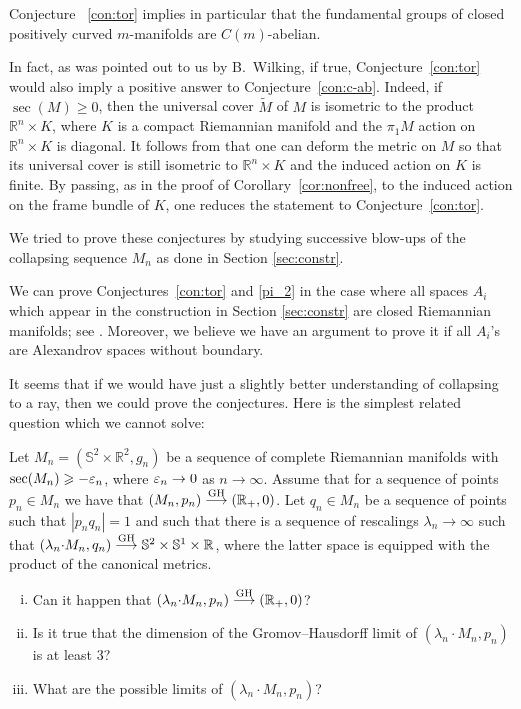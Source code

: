 \documentclass{amsart}
\begin{document}
Conjecture ~\ref{con:tor} implies in particular that the fundamental
groups of closed positively curved $m$-manifolds are $C(m)$-abelian.

In fact, as was pointed out to us by B.~Wilking, if true,
Conjecture~\ref{con:tor} would also imply a positive answer to Conjecture~\ref{con:c-ab}.
Indeed, if $\sec(M)\ge0$, then the universal cover $\tilde M$ of $M$ is isometric to the product $\mathbb{R}^n\times K$, where $K$ is a compact Riemannian manifold and the $\pi_1M$ action  on $\mathbb{R}^n\times K$ is diagonal.
It follows from \cite[Cor. 6.3]{wilking} that one can deform the metric on $M$ so that its universal cover is still isometric to $\mathbb{R}^n\times K$ and the induced action on $K$ is finite.
By passing, as in the proof of Corollary~\ref{cor:nonfree}, to the induced action on the frame bundle of $K$, one reduces the statement to Conjecture~\ref{con:tor}.

We tried to prove these conjectures by studying successive blow-ups of the
collapsing sequence $M_n$ as done in Section \ref{sec:constr}.

We can prove  Conjectures~\ref{con:tor} and \ref{pi_2} in the case where  all spaces $A_i$ which appear in the construction in  Section \ref{sec:constr} are closed Riemannian manifolds; 
see \cite{KPT}.
Moreover, we believe we have an argument to prove it if all $A_i$'s are Alexandrov spaces without boundary.

It seems that if we would have just a slightly better understanding of collapsing to a ray, then we could prove the conjectures.
Here is the simplest related question which we cannot solve:

\medskip

\begin{quest}
Let $M_n=(\mathbb{S}^2\times\mathbb{R}^2,g_n)$ be a sequence of complete Riemannian manifolds with  $\sec(M_n)\geqslant -\varepsilon_n$, where $\varepsilon_n\to0$ as $n\to\infty$.
Assume that for a sequence of points $p_n\in M_n$ we have that $(M_n,p_n)\GHto (\mathbb{R}_+,0)$.
Let $q_n\in M_n$  be a sequence of points such that $|p_n q_n|=1$ and such that there is a sequence of rescalings $\lambda_n\to\infty$ such that
$(\lambda_n{\cdot} M_n,q_n)\GHto \mathbb{S}^2\times \mathbb{S}^{1}\times \mathbb{R}$, where the latter space is equipped with the product of the canonical metrics.
\begin{enumerate}[(i)]

\item Can it happen that $(\lambda_n{\cdot} M_n,p_n)\GHto(\mathbb{R}_+,0)$?

\item Is it true that  the dimension of the Gromov--Hausdorff limit of $(\lambda_n {\cdot} M_n,p_n)$ is at least 3?

\item What are the possible limits of $(\lambda_n{\cdot}  M_n,p_n)$?

\end{enumerate}

\end{quest}
\medskip
\end{document}
